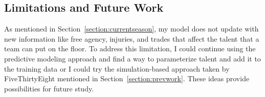 \documentclass[pageno]{jpaper}
\begin{document}
\subsection{Limitations and Future Work}

As mentioned in Section~\ref{section:currentseason}, my model does not update with new information like free agency, injuries, and trades that affect the talent that a team can put on the floor. To address this limitation, I could continue using the predictive modeling approach and find a way to parameterize talent and add it to the training data or I could try the simulation-based approach taken by FiveThirtyEight mentioned in Section~\ref{section:prevwork}. These ideas provide possibilities for future study. 



\end{document}
